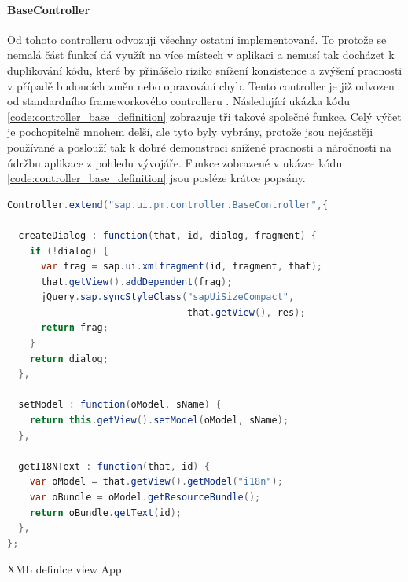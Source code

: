 \documentclass[thesis=M,czech]{FITthesis}[2012/06/26]
\begin{document}
\paragraph{BaseController} Od tohoto controlleru odvozuji všechny ostatní implementované. To protože se nemalá část funkcí dá využít na více místech v aplikaci a nemusí tak docházet k duplikování kódu, které by přinášelo riziko snížení konzistence a zvýšení pracnosti v případě budoucích změn nebo opravování chyb. Tento controller je již odvozen od standardního frameworkového controlleru . 
Následující ukázka kódu \ref{code:controller_base_definition} zobrazuje tři takové společné funkce. Celý výčet je pochopitelně mnohem delší, ale tyto  byly vybrány, protože jsou nejčastěji používané a poslouží tak k dobré demonstraci snížené pracnosti a náročnosti na údržbu aplikace z pohledu vývojáře. Funkce zobrazené v ukázce kódu \ref{code:controller_base_definition} jsou posléze krátce popsány.
\begin{algorithm}[H]
	\begin{lstlisting}[language=java]      
Controller.extend("sap.ui.pm.controller.BaseController",{

  createDialog : function(that, id, dialog, fragment) {
    if (!dialog) {
      var frag = sap.ui.xmlfragment(id, fragment, that);
      that.getView().addDependent(frag);
      jQuery.sap.syncStyleClass("sapUiSizeCompact", 
                                that.getView(), res);
      return frag;
    }
    return dialog;
  },  
  
  setModel : function(oModel, sName) {
    return this.getView().setModel(oModel, sName);
  },

  getI18NText : function(that, id) {
    var oModel = that.getView().getModel("i18n");
    var oBundle = oModel.getResourceBundle();
    return oBundle.getText(id);
  }, 
}; 
	\end{lstlisting}
	\caption{XML definice view App}	
	\label{code:controller_base_definition}
\end{algorithm}	
\end{document}
